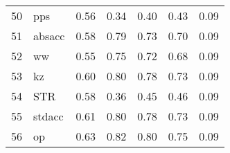 \documentclass[12pt]{article}
\begin{document}
\begin{footnotesize}
\begin{longtable}{rl|c|c|c|c|c}
50  & pps              & 0.56                                                                                      & 0.34                                                                                        & 0.40                                                                                         & 0.43 & 0.09               \\
51  & absacc           & 0.58                                                                                      & 0.79                                                                                        & 0.73                                                                                         & 0.70 & 0.09               \\
52  & ww               & 0.55                                                                                      & 0.75                                                                                        & 0.72                                                                                         & 0.68 & 0.09               \\
53  & kz               & 0.60                                                                                      & 0.80                                                                                        & 0.78                                                                                         & 0.73 & 0.09               \\
54  & STR              & 0.58                                                                                      & 0.36                                                                                        & 0.45                                                                                         & 0.46 & 0.09               \\
55  & stdacc           & 0.61                                                                                      & 0.80                                                                                        & 0.78                                                                                         & 0.73 & 0.09               \\
56  & op               & 0.63                                                                                      & 0.82                                                                                        & 0.80                                                                                         & 0.75 & 0.09               \\

\end{longtable}
\end{footnotesize}
\end{document}

